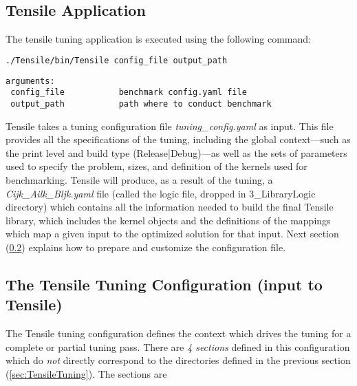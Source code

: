 \documentclass[]{article}
\begin{document}
\subsection{Tensile Application}
The tensile tuning application is executed using the following command:

\begin{lstlisting}[language=bash]
./Tensile/bin/Tensile config_file output_path
\end{lstlisting}

\begin{lstlisting}
arguments:
 config_file           benchmark config.yaml file
 output_path           path where to conduct benchmark
\end{lstlisting}

Tensile takes a tuning configuration file \emph{tuning\_config.yaml} as input. This file provides all the specifications of the tuning, including the global context---such as the print level and build type (Release|Debug)---as well as the sets of parameters used to specify the problem, sizes, and definition of the kernels used for benchmarking. Tensile will produce, as a result of the tuning, a \emph{Cijk\_Ailk\_Bljk.yaml} file (called the logic file, dropped in 3\_LibraryLogic directory) which contains all the information needed to build the final Tensile library, which includes the kernel objects and the definitions of the mappings which map a given input to the optimized solution for that input. Next section (\ref{sec:configfile}) explains how to prepare and customize the configuration file.


\subsection{The Tensile Tuning Configuration (input to Tensile)}
\label{sec:configfile}
The Tensile tuning configuration defines the context which drives the tuning for a complete or partial tuning pass. There are \textit{4 sections} defined in this configuration which do \textit{not} directly correspond to the directories defined in the previous section (\ref{sec:TensileTuning}). The sections are
\end{document}
